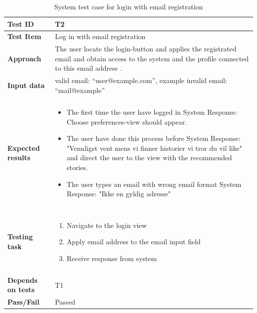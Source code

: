 \begin{appendices}
	\begin{table}[H]
		\small
		\centering
		\caption{System test case for login with email registration}
		\begin{tabular}{ | l | l  |}
			\hline
			\textbf{Test ID} & T2  \\ \hline 
			\textbf{Test Item} & Log in with email registration \\ \hline
			\textbf{Approach} & \begin{minipage}{5in}The user locate the login-button and applies the registrated email and obtain access to the system and the profile connected to this email address . \end{minipage}\\ \hline
			\textbf{Input data} &  valid email: “user@example.com”, \newline example invalid email: “mail@example”\\ \hline&\\[-3.8ex]
			\textbf{Expected results} & \begin{minipage}{5in}
			\begin{itemize}[noitemsep]
				\item The first time the user have logged in \newline System Response:  Choose preferences-view should appear.
				\item The user have done this process before \newline System Response: "Vennligst vent mens vi finner historier vi tror du vil like" and direct the user to the view with the recommended stories.
				\item The user types an email with wrong email format \newline System Response: "Ikke en gyldig adresse" 
				
			\end{itemize} \end{minipage}
			 \\ &\\[-3.8ex]\hline&\\[-3.8ex]
			\textbf{Testing task} & \begin{minipage}{5in}
			\begin{enumerate}[noitemsep]
			\item Navigate to the login view
			\item Apply email address to the email input field
			\item Receive response from system
			\end{enumerate}\end{minipage}
			 \\ &\\[-3.8ex]\hline
			\textbf{Depends on tests} & T1 \\ \hline					
			\textbf{Pass/Fail} & Passed \\\hline
		\end{tabular}
	

\end{table}
\end{appendices}

